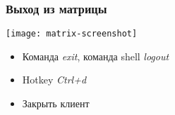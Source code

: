 \begin{frame}
  \frametitle{Выход из матрицы}

  \begin{center}
    \texttt{[image: matrix-screenshot]}
    \pause
    \newline
    \begin{itemize}
      \item Команда \emph{exit}, команда shell \emph{logout}
      \item Hotkey \emph{Ctrl+d}
      \item Закрыть клиент
    \end{itemize}
  \end{center}

\end{frame}
